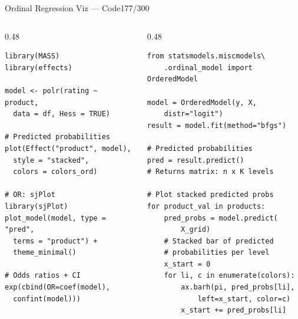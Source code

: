 \documentclass[10pt]{beamer}
\newcommand{\smark}[1]{\hfill{\scriptsize\color{codegray}#1}}
\begin{document}
\begin{frame}[fragile]{Ordinal Regression Viz --- Code}\smark{177/300}
\begin{columns}[T]
\begin{column}{0.48\textwidth}
\begin{lstlisting}[style=Rstyle]
library(MASS)
library(effects)

model <- polr(rating ~ product,
  data = df, Hess = TRUE)

# Predicted probabilities
plot(Effect("product", model),
  style = "stacked",
  colors = colors_ord)

# OR: sjPlot
library(sjPlot)
plot_model(model, type = "pred",
  terms = "product") +
  theme_minimal()

# Odds ratios + CI
exp(cbind(OR=coef(model),
  confint(model)))
\end{lstlisting}
\end{column}
\begin{column}{0.48\textwidth}
\begin{lstlisting}[style=Pystyle]
from statsmodels.miscmodels\
    .ordinal_model import OrderedModel

model = OrderedModel(y, X,
    distr="logit")
result = model.fit(method="bfgs")

# Predicted probabilities
pred = result.predict()
# Returns matrix: n x K levels

# Plot stacked predicted probs
for product_val in products:
    pred_probs = model.predict(
        X_grid)
    # Stacked bar of predicted
    # probabilities per level
    x_start = 0
    for li, c in enumerate(colors):
        ax.barh(pi, pred_probs[li],
            left=x_start, color=c)
        x_start += pred_probs[li]
\end{lstlisting}
\end{column}
\end{columns}
\end{frame}
\end{document}
